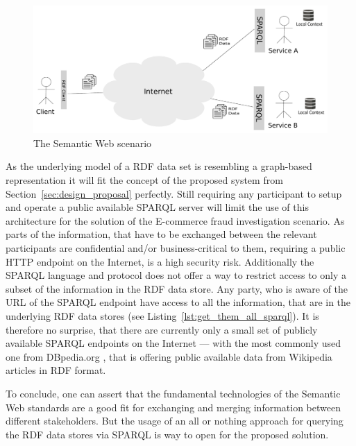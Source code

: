 \begin{figure}[H]
  \centering
  \includegraphics[width=0.9\columnwidth]{images/web-data-scenario.pdf}
  \caption{The Semantic Web scenario}
\label{fig:web_data_scenario}
\end{figure}

As the underlying model of a \gls{RDF} data set is resembling a graph-based representation it will fit the concept of the proposed system from Section~\ref{sec:design_proposal} perfectly. Still requiring any participant to setup and operate a public available \gls{SPARQL} server will limit the use of this architecture for the solution of the \gls{E-commerce} fraud investigation scenario. As parts of the information, that have to be exchanged between the relevant participants are confidential and/or business-critical to them, requiring a public \gls{HTTP} endpoint on the Internet, is a high security risk. Additionally the \gls{SPARQL} language and protocol does not offer a way to restrict access to only a subset of the information in the \gls{RDF} data store. Any party, who is aware of the \gls{URL} of the \gls{SPARQL} endpoint have access to all the information, that are in the underlying \gls{RDF} data stores (see Listing~\ref{lst:get_them_all_sparql}). It is therefore no surprise, that there are currently only a small set of publicly available \gls{SPARQL} endpoints on the Internet --- with the most commonly used one from DBpedia.org \citep{dbPedia.org}, that is offering public available data from Wikipedia articles in \gls{RDF} format. \@


To conclude, one can assert that the fundamental technologies of the Semantic Web standards are a good fit for exchanging and merging information between different stakeholders. But the usage of an all or nothing approach for querying the \gls{RDF} data stores via \gls{SPARQL} is way to open for the proposed solution.


